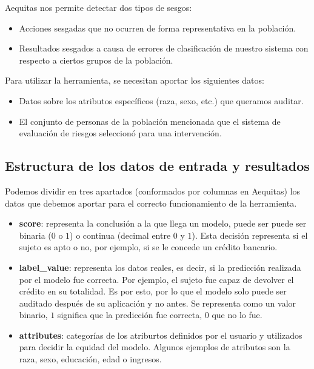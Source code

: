 Aequitas nos permite detectar dos tipos de sesgos:

\begin{itemize}
    \item Acciones sesgadas que no ocurren de forma representativa en la población.
    \item Resultados sesgados a causa de errores de clasificación de nuestro sistema con respecto a ciertos grupos de la población.
\end{itemize}

Para utilizar la herramienta, se necesitan aportar los siguientes datos:

\begin{itemize}
    \item Datos sobre los atributos específicos (raza, sexo, etc.) que queramos auditar.
    \item El conjunto de personas de la población mencionada que el sistema de evaluación de riesgos seleccionó para una intervención.
\end{itemize}

\subsection*{Estructura de los datos de entrada y resultados}

Podemos dividir en tres apartados (conformados por columnas en Aequitas) los datos que debemos aportar para el correcto funcionamiento de la herramienta.

\begin{itemize}
    \item \textbf{score}: representa la conclusión a la que llega un modelo, puede ser puede ser binaria ($0$ o $1$) o continua (decimal entre $0$ y $1$). Esta decisión representa si el sujeto es apto o no, por ejemplo, si se le concede un crédito bancario.
    \item \textbf{label\_value}: representa los datos reales, es decir, si la predicción realizada por el modelo fue correcta. Por ejemplo, el sujeto fue capaz de devolver el crédito en su totalidad. Es por esto, por lo que el modelo solo puede ser auditado después de su aplicación y no antes. Se representa como un valor binario, $1$ significa que la predicción fue correcta, $0$ que no lo fue.
    \item \textbf{attributes}: categorías de los atriburtos definidos por el usuario y utilizados para decidir la equidad del modelo. Algunos ejemplos de atributos son la raza, sexo, educación, edad o ingresos.
\end{itemize}

